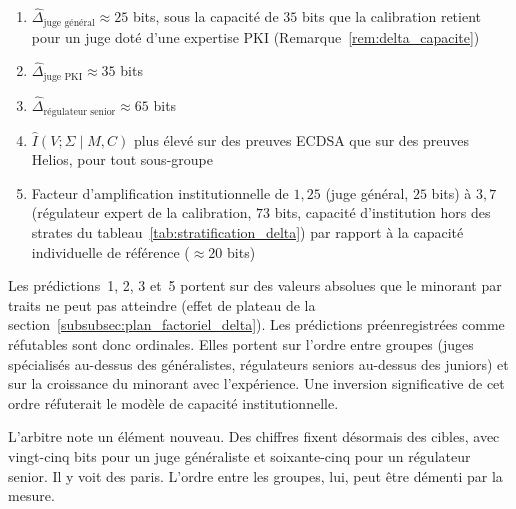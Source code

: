 \begin{sloppypar}
\begin{enumerate}
\item $\hat\Delta_{\text{juge g\'en\'eral}} \approx 25$ bits, sous la capacit\'e de $35$ bits que la calibration retient pour un juge dot\'e d'une expertise PKI (Remarque~\ref{rem:delta_capacite})
\item $\hat\Delta_{\text{juge PKI}} \approx 35$ bits
\item $\hat\Delta_{\text{r\'egulateur senior}} \approx 65$ bits
\item $\hat I(V;\Sigma \mid M,C)$ plus \'elev\'e sur des preuves ECDSA que sur des preuves Helios, pour tout sous-groupe
\item Facteur d'amplification institutionnelle de $1{,}25$ (juge g\'en\'eral, $25$ bits) \`a $3{,}7$
      (r\'egulateur expert de la calibration, $73$ bits, capacit\'e d'institution hors des strates du tableau~\ref{tab:stratification_delta}) par rapport \`a la capacit\'e individuelle de r\'ef\'erence ($\approx 20$ bits)
\end{enumerate}
Les pr\'edictions~1, 2, 3 et~5 portent sur des valeurs absolues que le minorant par
traits ne peut pas atteindre (effet de plateau de la
section~\ref{subsubsec:plan_factoriel_delta}). Les pr\'edictions pr\'eenregistr\'ees comme
r\'efutables sont donc ordinales. Elles portent sur l'ordre entre groupes (juges
sp\'ecialis\'es au-dessus des g\'en\'eralistes, r\'egulateurs seniors au-dessus des juniors)
et sur la croissance du minorant avec l'exp\'erience. Une inversion significative de
cet ordre r\'efuterait le mod\`ele de capacit\'e institutionnelle.
\end{sloppypar}

\begin{boiteArbitre}
L'arbitre note un \'el\'ement nouveau. Des chiffres fixent d\'esormais des cibles,
avec vingt-cinq bits pour un juge g\'en\'eraliste et soixante-cinq pour un
r\'egulateur senior. Il y voit des paris. L'ordre entre les groupes, lui, peut \^etre d\'ementi par la mesure.
\end{boiteArbitre}

